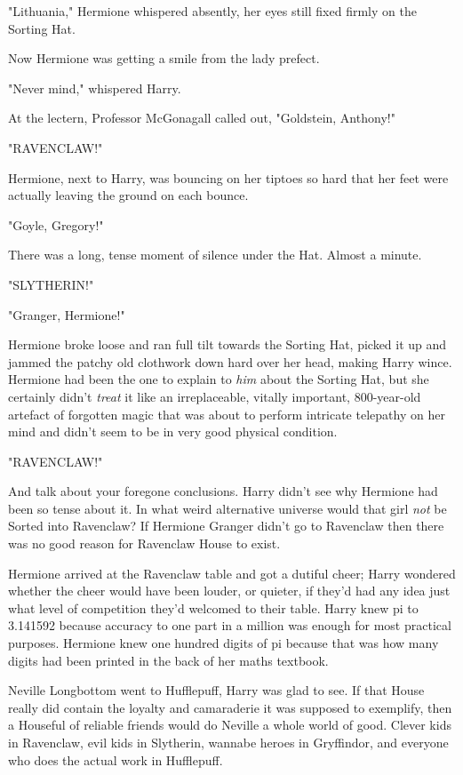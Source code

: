 "Lithuania," Hermione whispered absently, her eyes still fixed firmly on the 
Sorting Hat.

Now Hermione was getting a smile from the lady prefect.

"Never mind," whispered Harry.

At the lectern, Professor McGonagall called out, "Goldstein, Anthony!"

"RAVENCLAW!"

Hermione, next to Harry, was bouncing on her tiptoes so hard that her feet were 
actually leaving the ground on each bounce.

"Goyle, Gregory!"

There was a long, tense moment of silence under the Hat. Almost a minute.

"SLYTHERIN!"

"Granger, Hermione!"

Hermione broke loose and ran full tilt towards the Sorting Hat, picked it up 
and jammed the patchy old clothwork down hard over her head, making Harry 
wince. Hermione had been the one to explain to \emph{him} about the Sorting 
Hat, but she certainly didn't \emph{treat} it like an irreplaceable, vitally 
important, 800-year-old artefact of forgotten magic that was about to perform 
intricate telepathy on her mind and didn't seem to be in very good physical 
condition.

"RAVENCLAW!"

And talk about your foregone conclusions. Harry didn't see why Hermione had 
been so tense about it. In what weird alternative universe would that girl 
\emph{not} be Sorted into Ravenclaw? If Hermione Granger didn't go to Ravenclaw 
then there was no good reason for Ravenclaw House to exist.

Hermione arrived at the Ravenclaw table and got a dutiful cheer; Harry wondered 
whether the cheer would have been louder, or quieter, if they'd had any idea 
just what level of competition they'd welcomed to their table. Harry knew pi to 
3.141592 because accuracy to one part in a million was enough for most 
practical purposes. Hermione knew one hundred digits of pi because that was how 
many digits had been printed in the back of her maths textbook.

Neville Longbottom went to Hufflepuff, Harry was glad to see. If that House 
really did contain the loyalty and camaraderie it was supposed to exemplify, 
then a Houseful of reliable friends would do Neville a whole world of good. 
Clever kids in Ravenclaw, evil kids in Slytherin, wannabe heroes in Gryffindor, 
and everyone who does the actual work in Hufflepuff.

